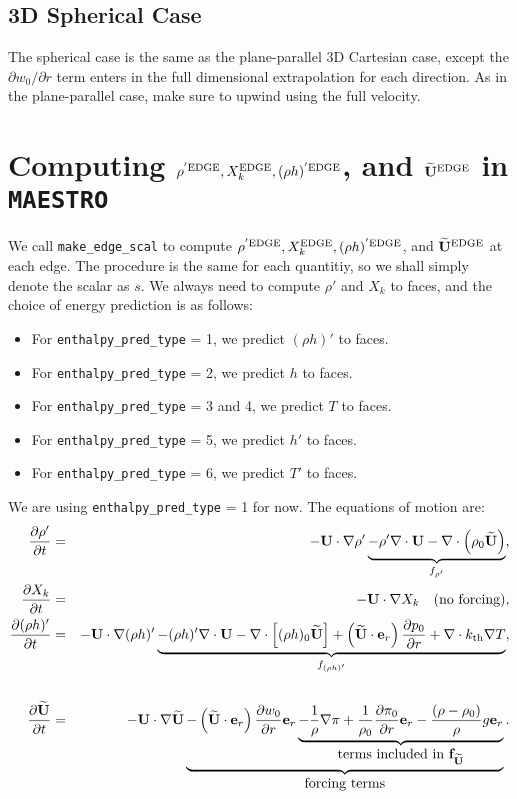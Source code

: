 \newpage

\subsection{3D Spherical Case}
The spherical case is the same as the plane-parallel 3D Cartesian 
case, except the $\partial w_0/\partial r$ term enters 
in the full dimensional extrapolation for each direction.
As in the plane-parallel case, make sure to upwind using the 
full velocity.

\newpage

\section{Computing $\rho^{'\rm EDGE}, X_k^{\rm EDGE},(\rho h)^{'\rm EDGE}$, and $\widetilde{{\bf U}}^{\rm EDGE}$ in {\tt MAESTRO}}\label{Scalar Edge State Prediction in MAESTRO}
We call {\tt make\_edge\_scal} to compute $\rho^{'\rm EDGE}, X_k^{\rm EDGE}, 
(\rho h)^{'\rm EDGE}$, and $\widetilde{{\bf U}}^{\rm EDGE}$ at each edge.
The procedure is the same for each quantitiy, so we shall simply denote 
the scalar as $s$.  We always need to compute $\rho'$ and $X_k$ to faces, 
and the choice of energy prediction is as follows:
\begin{itemize}
\item For {\tt enthalpy\_pred\_type} = 1, we predict $(\rho h)'$ to faces.
\item For {\tt enthalpy\_pred\_type} = 2, we predict $h$ to faces.
\item For {\tt enthalpy\_pred\_type} = 3 and 4, we predict $T$ to faces.
\item For {\tt enthalpy\_pred\_type} = 5, we predict $h'$ to faces.
\item For {\tt enthalpy\_pred\_type} = 6, we predict $T'$ to faces.
\end{itemize}
We are using {\tt enthalpy\_pred\_type} = 1 for now.  The equations
of motion are:
\begin{eqnarray}
\frac{\partial \rho'}{\partial t} &=& -{\bf U}\cdot\nabla\rho' \underbrace{- \rho'\nabla\cdot{\bf U} - \nabla\cdot\left(\rho_0\widetilde{{\bf U}}\right)}_{f_{\rho'}}, \\
\frac{\partial X_k}{\partial t} &=& -{\bf U}\cdot\nabla X_k ~~~ \text{(no forcing)}, \\
\frac{\partial(\rho h)'}{\partial t} &=& -{\bf U}\cdot\nabla(\rho h)' \underbrace{- (\rho h)'\nabla\cdot{\bf U} - \nabla\cdot\left[(\rho h)_0\widetilde{{\bf U}}\right] + \left(\widetilde{{\bf U}}\cdot{\bf e}_r\right)\frac{\partial p_0}{\partial r} + \nabla\cdot k_{\rm th}\nabla T}_{f_{(\rho h)'}}, \nonumber \\
&& \\
\frac{\partial\widetilde{{\bf U}}}{\partial t} &=& -{\bf U}\cdot\nabla\widetilde{{\bf U}} \underbrace{- \left(\widetilde{{\bf U}}\cdot{\bf e}_r\right)\frac{\partial w_0}{\partial r}{\bf e}_r \underbrace{- \frac{1}{\rho}\nabla\pi + \frac{1}{\rho_0}\frac{\partial\pi_0}{\partial r}{\bf e}_r - \frac{(\rho-\rho_0)}{\rho}g{\bf e}_r}_{\hbox{terms included in ${\bf f}_{\widetilde{{\bf U}}}$}}}_{\hbox{forcing terms}}.
\end{eqnarray}

